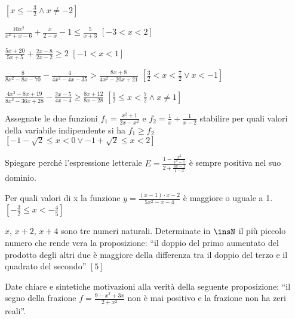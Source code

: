 \begin{esercizio}[\Ast]
\begin{enumeratea}
 \hfill $\left[x\le -\frac 3 2 \wedge x \neq -2\right]$
\item $\frac{10x^2}{x^2+x-6}+\frac x{2-x}-1\le \frac 5{x+3}$ 
 \hfill $\left[-3<x<2\right]$
\item $\frac{5x+20}{5x+5}+\frac{2x-8}{2x-2}\ge 2$ 
 \hfill $\left[-1<x<1\right]$
\item $\frac 8{8x^2-8x-70}-\frac 4{4x^2-4x-35}>\frac{8x+8}{4x^2-20x+21}$
 \hfill $\left[\frac 3 2<x<\frac 7 2\vee x<-1\right]$
\item $\frac{4x^2-8x+19}{8x^2-36x+28}-\frac{2x-5}{4x-4}\ge \frac{8x+12}{8x-28}$
 \hfill $\left[\frac 1 2\le x<\frac 7 2 \wedge x \neq 1\right]$
\end{enumeratea}
\end{esercizio}

\begin{esercizio}[\Ast]
 \label{ese:4.68}
Assegnate le due funzioni $f_1=\frac{x^2+1}{2x-x^2}$ e $f_2=\frac 1 x+\frac 
1{x-2}$ stabilire per quali valori della variabile indipendente si ha $f_1\ge 
f_2$
 \hfill $\left[-1-\sqrt 2\le x<0\vee -1+\sqrt 2\le x<2\right]$
\end{esercizio}

\begin{esercizio}
 \label{ese:4.69}
Spiegare perché l'espressione letterale 
$E=\frac{1-\frac{x^2}{x^2-1}}{2+\frac{3x-1}{1-x}}$ è sempre positiva nel suo 
dominio.
\end{esercizio}

\begin{esercizio}[\Ast]
 \label{ese:4.70}
Per quali valori di x la funzione $y=\frac{(x-1)\cdot x-2}{5x^2-x-4}$ è maggiore 
o uguale a 1.
 \hfill $\left[-\frac 3 2\le x<-\frac 4 5\right]$
\end{esercizio}

\begin{esercizio}[\Ast]
 \label{ese:4.71}
$ x $, $ x+2 $, $ x+4 $ sono tre numeri naturali. Determinate in $ \insN $ il 
più piccolo numero che rende vera la proposizione: ``il doppio del primo 
aumentato del prodotto degli altri due è maggiore della differenza tra il doppio 
del terzo e il quadrato del secondo''
 \hfill $\left[5\right]$
\end{esercizio}

\begin{esercizio}
 \label{ese:4.72}
Date chiare e sintetiche motivazioni alla verità della seguente proposizione: 
``il segno della frazione $f=\frac{9-x^2+3x}{2+x^2}$ non è mai positivo e la 
frazione non ha zeri reali''.
\end{esercizio}

